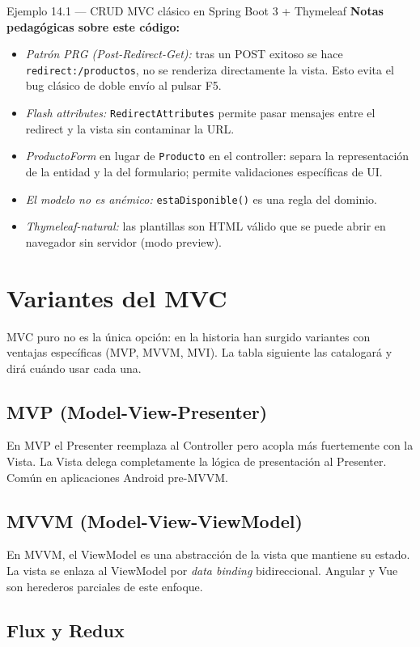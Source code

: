 \documentclass[11pt,a4paper,openany]{book}
\begin{document}
\begin{cajaejemplo}{Ejemplo 14.1 --- CRUD MVC clásico en Spring Boot 3 + Thymeleaf}
\textbf{Notas pedagógicas sobre este código:}
\begin{itemize}
\item \emph{Patrón PRG (Post-Redirect-Get):} tras un POST exitoso se
hace \texttt{redirect:/productos}, no se renderiza directamente la
vista. Esto evita el bug clásico de doble envío al pulsar F5.
\item \emph{Flash attributes:} \texttt{RedirectAttributes} permite
pasar mensajes entre el redirect y la vista sin contaminar la URL.
\item \emph{ProductoForm} en lugar de \texttt{Producto} en el
controller: separa la representación de la entidad y la del
formulario; permite validaciones específicas de UI.
\item \emph{El modelo no es anémico:} \texttt{estaDisponible()} es
una regla del dominio.
\item \emph{Thymeleaf-natural:} las plantillas son HTML válido que se
puede abrir en navegador sin servidor (modo preview).
\end{itemize}
\end{cajaejemplo}

\section{Variantes del MVC}

MVC puro no es la única opción: en la historia han surgido
variantes con ventajas específicas (MVP, MVVM, MVI). La tabla
siguiente las catalogará y dirá cuándo usar cada una.


\subsection{MVP (Model-View-Presenter)}

En MVP el Presenter reemplaza al Controller pero acopla más
fuertemente con la Vista. La Vista delega completamente la lógica de
presentación al Presenter. Común en aplicaciones Android pre-MVVM.

\subsection{MVVM (Model-View-ViewModel)}

En MVVM, el ViewModel es una abstracción de la vista que mantiene su
estado. La vista se enlaza al ViewModel por \emph{data binding}
bidireccional. Angular y Vue son herederos parciales de este enfoque.

\subsection{Flux y Redux}
\end{document}
